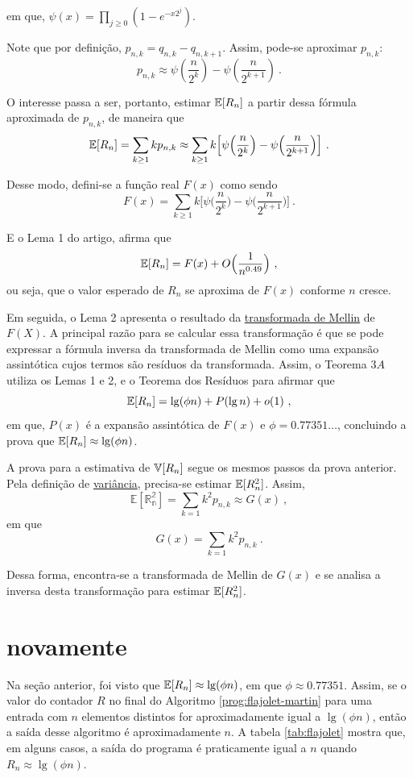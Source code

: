em que, $\psi(x) = \prod_{j \geq 0} (1 - e^{-x2^j})$.

Note que por definição, $p_{n,k} = q_{n,k} - q_{n,k+1}$. Assim, pode-se aproximar $p_{n,k}$:
\[ p_{n,k} \approx \psi(\frac{n}{2^k}) - \psi(\frac{n}{2^{k+1}}) \ . \]

O interesse passa a ser, portanto, estimar $\mathbb{E}[R_n]$ a partir dessa fórmula aproximada de $p_{n,k}$, de maneira 
que 
\[ \mathbb{E}[R_n] = \sum_{k \geq 1} k p_{n,k} \approx \sum_{k \geq 1} k \Big[ \psi \Big( \frac{n}{2^k} \Big) - \psi 
  \Big( \frac{n}{2^{k+1}} \Big) \Big] \ . \]

Desse modo, defini-se a função real $F(x)$ como sendo
\[ F(x) =  \sum_{k \geq 1} k \Big[ \psi \Big( \frac{n}{2^k} \Big) - \psi \Big( \frac{n}{2^{k+1}} \Big) \Big] \ . \]

E o Lema 1 do artigo, afirma que 
\[ \mathbb{E}[R_n] = F(x) + O \Big( \frac{1}{n^{0.49}} \Big) \ , \]
ou seja, que o valor esperado de $R_n$ se aproxima de $F(x)$ conforme $n$ cresce.

Em seguida, o Lema 2 apresenta o resultado da \hyperref[ap:mellin]{transformada de Mellin} de $F(X)$. A principal razão 
para se calcular essa transformação é que se pode expressar a fórmula inversa da transformada de Mellin como uma 
expansão assintótica cujos termos são resíduos da transformada. Assim, o Teorema $3A$ utiliza os Lemas 1 e 2, e o 
Teorema dos Resíduos para afirmar que 
\[ \Ebb[R_n] = \lg (\phi n) + P(\lg n) + o(1) \ , \]
em que, $P(x)$ é a expansão assintótica de $F(x)$ e $\phi = 0.77351\dots$, concluindo a prova que 
$\mathbb{E}[R_n] \approx \lg (\phi n)$.

A prova para a estimativa de $\mathbb{V}[R_n]$ segue os mesmos passos da prova anterior. Pela definição de 
\hyperref[ap:variance]{variância}, precisa-se estimar $\mathbb{E}[R_n ^ 2]$. Assim, 
\[ \mathbb{E[R_n ^2]} = \sum_{k=1} k^2 p_{n,k} \approx G(x) \ , \]
em que
\[ G(x) = \sum_{k=1} k^2 p_{n,k} \ . \]

Dessa forma, encontra-se a transformada de Mellin de $G(x)$ e se analisa a inversa desta transformação para estimar 
$\mathbb{E}[R_n^2]$.

\section{ novamente}

Na seção anterior, foi visto que $\mathbb{E}[R_n] \approx \lg(\phi n)$, em que $\phi \approx 0.77351$. Assim, se o valor 
do contador $R$ no final do Algoritmo \ref{prog:flajolet-martin} para uma entrada com $n$ elementos distintos for 
aproximadamente igual a $\lg(\phi n)$, então a saída desse algoritmo é aproximadamente $n$. A tabela \ref{tab:flajolet} 
mostra que, em alguns casos, a saída do programa é praticamente igual a $n$ quando $R_n \approx \lg(\phi n)$.

